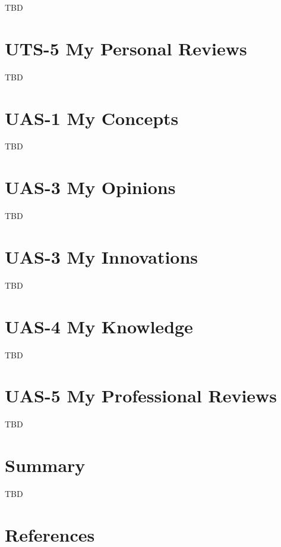 \documentclass[
  letterpaper,
  DIV=11,
  numbers=noendperiod]{scrreprt}
\begin{document}
TBD


\chapter{UTS-5 My Personal Reviews}\label{uts-5-my-personal-reviews}

TBD


\chapter{UAS-1 My Concepts}\label{uas-1-my-concepts}

TBD


\chapter{UAS-3 My Opinions}\label{uas-3-my-opinions}

TBD


\chapter{UAS-3 My Innovations}\label{uas-3-my-innovations}

TBD


\chapter{UAS-4 My Knowledge}\label{uas-4-my-knowledge}

TBD


\chapter{UAS-5 My Professional
Reviews}\label{uas-5-my-professional-reviews}

TBD


\chapter{Summary}\label{summary}

TBD


\chapter*{References}\label{references}


\label{refs}
\end{document}
